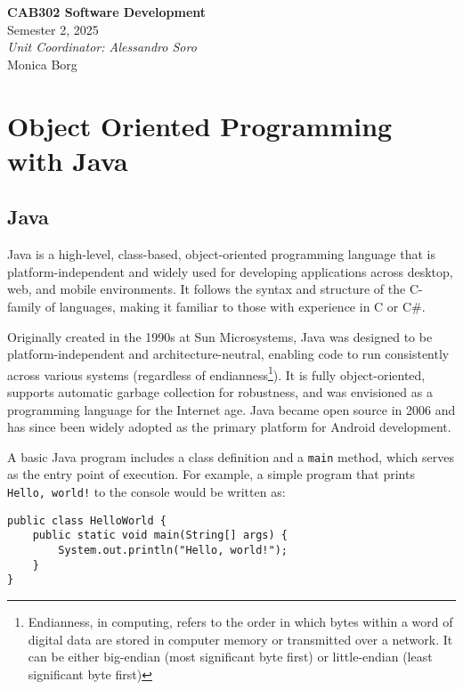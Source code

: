 \documentclass{article}
\date{}
\newcommand{\unitName}{CAB302 Software Development}
\newcommand{\unitTime}{Semester 2, 2025}
\newcommand{\unitCoordinator}{Unit Coordinator: Alessandro Soro}
\newcommand{\documentAuthors}{Monica Borg}
\begin{document}
%
\begin{titlepage}
    \vspace*{\fill}
    \begin{center}
        \LARGE{\textbf{\unitName}} \\[0.1in]
        \normalsize{\unitTime} \\[0.2in]
        \normalsize\textit{\unitCoordinator} \\[0.2in]
        \documentAuthors
    \end{center}
    \vspace*{\fill}
    \thispagestyle{empty}
\end{titlepage}
\newpage
%
\tableofcontents
\newpage
%
\section{Object Oriented Programming with Java}

\subsection{Java}
Java is a high-level, class-based, object-oriented programming language that is platform-independent and widely used for developing applications across desktop, web, and mobile environments. It follows the syntax and structure of the C-family of languages, making it familiar to those with experience in C or C\#.

Originally created in the 1990s at Sun Microsystems, Java was designed to be platform-independent and architecture-neutral, enabling code to run consistently across various systems (regardless of endianness\footnote{Endianness, in computing, refers to the order in which bytes within a word of digital data are stored in computer memory or transmitted over a network. It can be either big-endian (most significant byte first) or little-endian (least significant byte first)}). It is fully object-oriented, supports automatic garbage collection for robustness, and was envisioned as a programming language for the Internet age. Java became open source in 2006 and has since been widely adopted as the primary platform for Android development.

A basic Java program includes a class definition and a \texttt{main} method, which serves as the entry point of execution. For example, a simple program that prints \texttt{Hello, world!} to the console would be written as:

\begin{verbatim}
public class HelloWorld {
    public static void main(String[] args) {
        System.out.println("Hello, world!");
    }
}
\end{verbatim}
\end{document}
